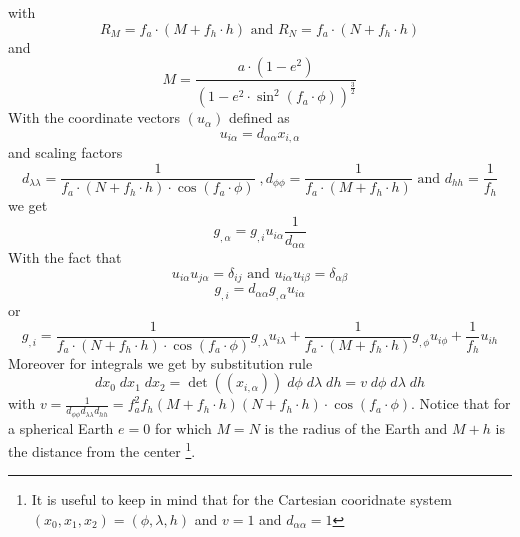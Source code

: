 with 
\begin{equation}
R_M = f_{a}  \cdot (M + f_{h}  \cdot h) \mbox{ and }
R_N = f_{a}  \cdot  (N + f_{h}  \cdot h) 
\label{equ:geodetic:5}
\end{equation}
and 
\begin{equation}
 M = \frac{a \cdot  (1-e^2) }{(1- e^2 \cdot \sin^2(f_{a} \cdot  \phi))^{\frac{3}{2}}}
\label{equ:geodetic:5}
\end{equation}
With the coordinate vectors $(u_{\alpha})$ defined as 
\begin{equation}
u_{i \alpha} = d_{\alpha \alpha} x_{i,\alpha}
\end{equation}
and scaling factors 
\begin{equation}
d_{\lambda \lambda} =  \frac{1}{f_{a} \cdot (N + f_{h} \cdot h) \cdot \cos(f_{a} \cdot  \phi)}  \; , 
d_{\phi \phi} = \frac{1}{f_{a} \cdot (M + f_{h} \cdot h)} \mbox{ and }
d_{h h} = \frac{1}{f_{h}}
\end{equation}
we get 
\begin{equation}
g_{,\alpha}   =    g_{,i} u_{i \alpha} \frac{1}{d_{\alpha \alpha}} 
\end{equation}
With the fact that 
\begin{equation}
 u_{i \alpha} u_{j \alpha} = \delta_{ij} \mbox{ and }  u_{i \alpha} u_{i \beta} = \delta_{\alpha \beta}
\end{equation}
\begin{equation}
g_{,i} = d_{\alpha \alpha} g_{,\alpha}  u_{i \alpha} 
\end{equation}
or 
\begin{equation}
g_{,i} = 
\frac{1}{f_{a} \cdot (N + f_{h} \cdot h) \cdot \cos(f_{a} \cdot  \phi) }  g_{,\lambda}  u_{i \lambda} +
\frac{1}{f_{a} \cdot (M + f_{h} \cdot h)}   g_{,\phi}  u_{i \phi} + 
\frac{1}{f_{h}}  u_{i h} 
\end{equation} 
Moreover for integrals we get by substitution rule 
\begin{equation}
dx_0 \; dx_1  \;  dx_2 =\det((x_{i,\alpha}))  \;  d \phi  \;   d\lambda   \;  dh = v \;  d \phi  \;   d\lambda   \;  dh
\end{equation} 
with  $v= \frac{1}{d_{\phi \phi} d_{\lambda \lambda} d_{h h}} =
f_{a}^2 f_{h} (M + f_{h} \cdot h) (N + f_{h} \cdot h) \cdot \cos(f_{a} \cdot  \phi) 
$.
Notice that for a spherical Earth $e=0$ for which $M=N$ is the radius of the Earth and $M+h$ is the distance from
the center \footnote{It is useful to keep in mind that
for the Cartesian cooridnate system $(x_0, x_1, x_2) = (\phi, \lambda, h)$ and $v=1$ and $d_{\alpha \alpha}=1$}. 

